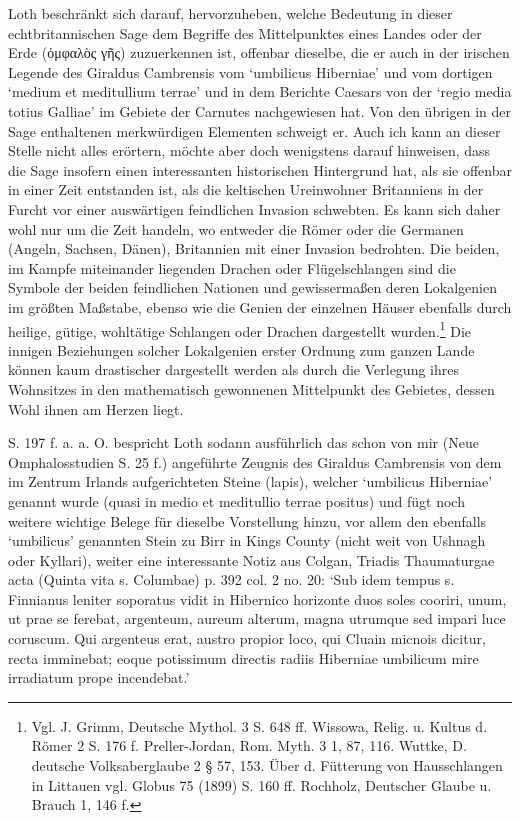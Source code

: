 \documentclass[a4paper, 11pt, oneside]{article}
\begin{document}
Loth beschränkt sich darauf, hervorzuheben, welche Bedeutung in dieser echtbritannischen Sage dem Begriffe des Mittelpunktes eines Landes oder der Erde (ὀμφαλὸς γῆς) zuzuerkennen ist, offenbar dieselbe, die er auch in der irischen Legende des Giraldus Cambrensis vom `umbilicus Hiberniae' und vom dortigen `medium et meditullium terrae' und in dem Berichte Caesars von der `regio media totius Galliae' im Gebiete der Carnutes nachgewiesen hat. Von den übrigen in der Sage enthaltenen merkwürdigen Elementen schweigt er. Auch ich kann an dieser Stelle nicht alles erörtern, möchte aber doch wenigstens darauf hinweisen, dass die Sage insofern einen interessanten historischen Hintergrund hat, als sie offenbar in einer Zeit entstanden ist, als die keltischen Ureinwohner Britanniens in der Furcht vor einer auswärtigen feindlichen Invasion schwebten. Es kann sich daher wohl nur um die Zeit handeln, wo entweder die Römer oder die Germanen (Angeln, Sachsen, Dänen), Britannien mit einer Invasion bedrohten. Die beiden, im Kampfe miteinander liegenden Drachen oder Flügelschlangen sind die Symbole der beiden feindlichen Nationen und gewissermaßen deren Lokalgenien im größten Maßstabe, ebenso wie die Genien der einzelnen Häuser ebenfalls durch heilige, gütige, wohltätige Schlangen oder Drachen dargestellt wurden.\footnote{Vgl. J. Grimm, Deutsche Mythol. 3 S. 648 ff. Wissowa, Relig. u. Kultus d. Römer 2 S. 176 f. Preller-Jordan, Rom. Myth. 3 1, 87, 116. Wuttke, D. deutsche Volksaberglaube 2 § 57, 153. Über d. Fütterung von Hausschlangen in Littauen vgl. Globus 75 (1899) S. 160 ff. Rochholz, Deutscher Glaube u. Brauch 1, 146 f.} Die innigen Beziehungen solcher Lokalgenien erster Ordnung zum ganzen Lande können kaum drastischer dargestellt werden als durch die Verlegung ihres Wohnsitzes in den mathematisch gewonnenen Mittelpunkt des Gebietes, dessen Wohl ihnen am Herzen liegt.

S. 197 f. a. a. O. bespricht Loth sodann ausführlich das schon von mir (Neue Omphalosstudien S. 25 f.) angeführte Zeugnis des Giraldus Cambrensis von dem im Zentrum Irlands aufgerichteten Steine (lapis), welcher `umbilicus Hiberniae' genannt wurde (quasi in medio et meditullio terrae positus) und fügt noch weitere wichtige Belege für dieselbe Vorstellung hinzu, vor allem den ebenfalls `umbilicus' genannten Stein zu Birr in Kings County (nicht weit von Ushnagh oder Kyllari), weiter eine interessante Notiz aus Colgan, Triadis Thaumaturgae acta (Quinta vita s. Columbae) p. 392 col. 2 no. 20: `Sub idem tempus s. Finnianus leniter soporatus vidit in Hibernico horizonte duos soles cooriri, unum, ut prae se ferebat, argenteum, aureum alterum, magna utrumque sed impari luce coruscum. Qui argenteus erat, austro propior loco, qui Cluain micnois dicitur, recta imminebat; eoque potissimum directis radiis Hiberniae umbilicum mire irradiatum prope incendebat.'
\end{document}
